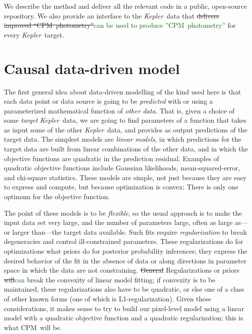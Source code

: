 \documentclass[12pt, preprint]{aastex}
\newcommand{\project}[1]{\textsl{#1}}
\newcommand{\Kepler}{\project{Kepler}}
\newcommand{\name}{CPM}
\newcommand{\revise}[1]{\textcolor{darkgreen}{#1}}
\newcommand{\remove}[1]{\sout{#1}}
\begin{document}
We describe the method and deliver all the relevant code in a public, open-source repository.
We also provide an interface to the \Kepler\ data that \remove{delivers improved ``\name\ photometry''}\revise{can be used
to produce ''\name\ photometry''}
  for every \Kepler\ target.

\section{Causal data-driven model}

The first general idea about data-driven modelling of the kind used here
  is that each data point or data source is going to be 
  \emph{predicted} with or using a parameterized mathematical function of \emph{other data}.
That is, given a choice of some \emph{target} \Kepler\ data,
  we are going to find parameters of a function that takes as input some of the other \Kepler\ data,
  and provides as output predictions of the target data.
The simplest models are \emph{linear models},
  in which predictions for the target data are built from linear combinations of the other data,
  and in which the objective functions are quadratic in the prediction residual.
Examples of quadratic objective functions include Gaussian likelihoods, mean-squared-error, and chi-square statistics.
These models are simple,
  not just because they are easy to express and compute,
  but because optimization is convex:
There is only one optimum for the objective function.

The point of these models is to be \emph{flexible},
  so the usual approach is to make the input data set very large,
  and the number of parameters large,
  often as large as---or larger than---the target data available.
Such fits require \emph{regularization} to break degeneracies
  and control ill-constrained parameters.
These regularizations do for optimizations what priors do for posterior probability inferences;
  they express the desired behavior of the fit in the absence of data
  or along directions in parameter space in which the data are not constraining.
\remove{General} Regularizations or priors \remove{will}\revise{can} break the convexity of linear model fitting;
  if convexity is to be maintained, these regularizations also have to be quadratic,
  or else one of a class of other known forms (one of which is L1-regularization).
Given these considerations, it makes sense to try to build our pixel-level model
  using a linear model with a quadratic objective function and a quadratic regularization;
  this is what \name\ will be.
\end{document}
